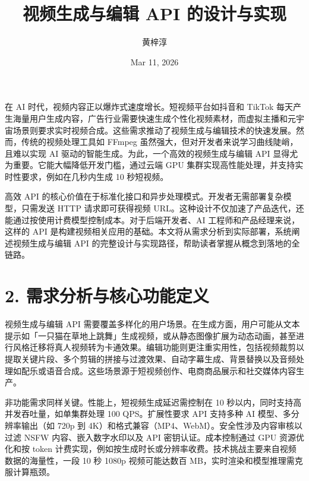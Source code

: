 \title{视频生成与编辑 API 的设计与实现}
\author{黄梓淳}
\date{Mar 11, 2026}
\maketitle
在 AI 时代，视频内容正以爆炸式速度增长。短视频平台如抖音和 TikTok 每天产生海量用户生成内容，广告行业需要快速生成个性化视频素材，而虚拟主播和元宇宙场景则要求实时视频合成。这些需求推动了视频生成与编辑技术的快速发展。然而，传统的视频处理工具如 FFmpeg 虽然强大，但对开发者来说学习曲线陡峭，且难以实现 AI 驱动的智能生成。为此，一个高效的视频生成与编辑 API 显得尤为重要。它能大幅降低开发门槛，通过云端 GPU 集群实现高性能处理，并支持实时性要求，例如在几秒内生成 10 秒短视频。\par
高效 API 的核心价值在于标准化接口和异步处理模式。开发者无需部署复杂模型，只需发送 HTTP 请求即可获得视频 URL。这种设计不仅加速了产品迭代，还能通过按使用计费模型控制成本。对于后端开发者、AI 工程师和产品经理来说，这样的 API 是构建视频相关应用的基础。本文将从需求分析到实际部署，系统阐述视频生成与编辑 API 的完整设计与实现路径，帮助读者掌握从概念到落地的全链路。\par
\chapter{2. 需求分析与核心功能定义}
视频生成与编辑 API 需要覆盖多样化的用户场景。在生成方面，用户可能从文本提示如「一只猫在草地上跳舞」生成视频，或从静态图像扩展为动态动画，甚至进行风格迁移将真人视频转为卡通效果。编辑功能则更注重实用性，包括视频裁剪以提取关键片段、多个剪辑的拼接与过渡效果、自动字幕生成、背景替换以及音频处理如配乐或语音合成。这些场景源于短视频创作、电商商品展示和社交媒体内容生产。\par
非功能需求同样关键。性能上，短视频生成延迟需控制在 10 秒以内，同时支持高并发吞吐量，如单集群处理 100 QPS。扩展性要求 API 支持多种 AI 模型、多分辨率输出（如 720p 到 4K）和格式兼容（MP4、WebM）。安全性涉及内容审核以过滤 NSFW 内容、嵌入数字水印以及 API 密钥认证。成本控制通过 GPU 资源优化和按 token 计费实现，例如按生成时长或分辨率收费。技术挑战主要来自视频数据的海量性，一段 10 秒 1080p 视频可能达数百 MB，实时渲染和模型推理需克服计算瓶颈。\par
